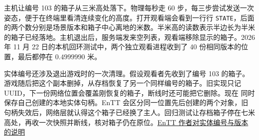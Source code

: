 主机让编号 103 的箱子从三米高处落下。物理每秒走 60 步，每三步尝试发送一次姿态，便于在终端里看清连续变化的高度。打开观看端会看到一行行 \texttt{STATE}，后面的两个数分别是场景版本和箱子中心离地的米数。半米高的读数表示半边长为半米的箱子已经落地。主机退出后，服务端发来空列表，观看端移除显示的箱子。2026 年 11 月 22 日的本机回环测试中，两个独立观看进程收到了 40 份相同版本的位置，最后都停在 $0.4999990$ 米。

实体编号还涉及退出游戏时的一次清理。假设观看者先收到了编号 103 的箱子。游戏随后把这个副本删掉，从存档恢复了另一个同样编号的箱子。旧实现只记 UUID，下一份网络位置会覆盖刚恢复的箱子，断线时还可能把它删除。现在  同时保存自己创建的本地实体句柄。EnTT 会区分同一位置先后创建的两个对象，旧句柄失效后，网络层就认得这个箱子已经换了主人。回归测试让存档箱子停在七米高处，再收一次快照并断线，核对箱子仍在原位。\href{https://github.com/skypjack/entt/blob/main/docs/md/entity.md}{EnTT 作者对实体编号与版本的说明}

